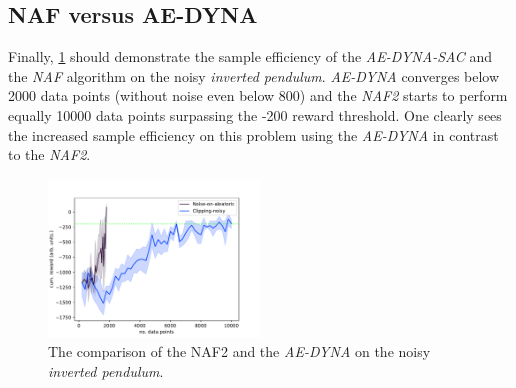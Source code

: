 \documentclass[
reprint,
amsmath,amssymb,amsfonts,clevref,
aps,
prstab,
]{revtex4-2}
\begin{document}
\subsection{NAF versus AE-DYNA}
	Finally, \cref{fig:comparsion_NAF_AE-DYNA} should demonstrate the sample efficiency of the \emph{AE-DYNA-SAC} and the \emph{NAF} algorithm on the noisy \emph{inverted pendulum}. \emph{AE-DYNA} converges below 2000 data points (without noise even below 800) and the \emph{NAF2} starts to perform equally 10000 data points surpassing the -200 reward threshold. One clearly sees the increased sample efficiency on this problem using the \emph{AE-DYNA} in contrast to the \emph{NAF2}.
		\begin{figure}[!h]
		\centering
		\includegraphics*[width=0.5\textwidth]{Figures/Comparison_NAF_ae_dyna}
		\caption{The comparison of the NAF2 and the \emph{AE-DYNA} on the noisy \emph{inverted pendulum}.}
		\label{fig:comparsion_NAF_AE-DYNA}
	\end{figure}



\end{document}
